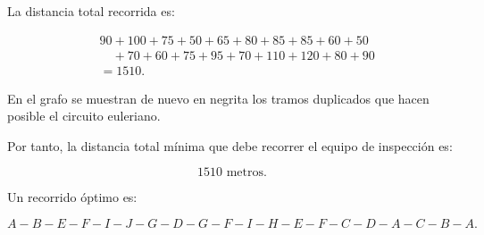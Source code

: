 \begin{enumerate}
La distancia total recorrida es:

\[
\begin{aligned}
&90+100+75+50+65+80+85+85+60+50\\
&\quad +70+60+75+95+70+110+120+80+90\\
&=1510.
\end{aligned}
\]

En el grafo se muestran de nuevo en negrita los tramos duplicados que hacen posible el circuito euleriano.

\begin{center}
\end{center}

Por tanto, la distancia total mínima que debe recorrer el equipo de inspección es:

\[
\boxed{1510\text{ metros}}.
\]

Un recorrido óptimo es:

\[
\boxed{A-B-E-F-I-J-G-D-G-F-I-H-E-F-C-D-A-C-B-A}.
\]


\end{enumerate}
